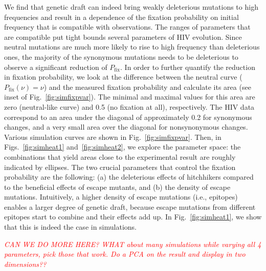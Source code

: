 \documentclass[rmp, twocolumn]{revtex4}
\newcommand{\comment}[1]{\textit{\textcolor{red}{#1}}}
\newcommand{\FIG}[1]{Fig.~\ref{fig:#1}}
\newcommand{\FIGS}[2]{Figs.~\ref{fig:#1} and~\ref{fig:#2}}
\begin{document}
We find that genetic draft can indeed bring weakly
deleterious mutations to high frequencies and result in a dependence of the
fixation probability on initial frequency that is compatible with observations.
The ranges of parameters that are compatible put tight bounds several
parameters of HIV evolution.
Since neutral mutations are much more likely to rise to high
frequency than deleterious ones, the majority of the synonymous mutations needs
to be deleterious to observe a significant reduction of $P_\text{fix}$.
In order to further quantify the reduction in fixation probability, we look at
the difference between the neutral curve ($P_\text{fix}(\nu) = \nu$) and the
measured fixation probability and calculate its area (see inset of
\FIG{simfixpvar}). The minimal and maximal values for this area are zero
(neutral-like curve) and 0.5 (no fixation at all), respectively. The HIV data
correspond to an area under the diagonal of approximately 0.2 for synonymous
changes, and a very small area over the diagonal for nonsynonymous changes.
Various simulation curves are shown in \FIG{simfixpvar}. Then, in
\FIGS{simheat1}{simheat2}, we explore the parameter space: the combinations that
yield areas close to the experimental result are roughly indicated by ellipses.
The two crucial parameters that control the fixation probability are the
following: (a) the deleterious effects of hitchhikers compared to the beneficial
effects of escape mutants, and (b) the density of escape mutations. Intuitively,
a higher density of escape mutations (i.e., epitopes) enables a larger degree of
genetic draft, because escape mutations from different epitopes start to combine
and their effects add up. In \FIG{simheat1}, we show that this is indeed the
case in simulations.

\comment{CAN WE DO MORE HERE? WHAT about many simulations while varying all 4
parameters, pick those that work. Do a PCA on the result and display in two dimensions?? }
\end{document}
